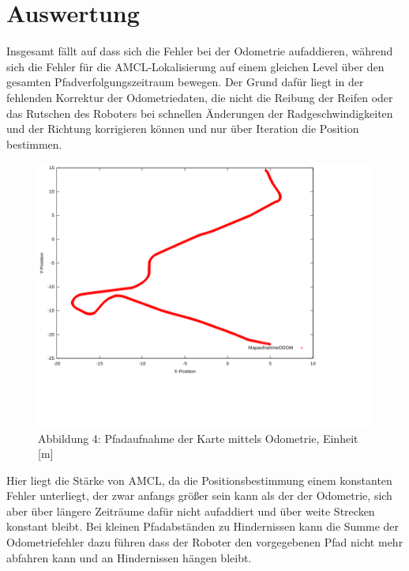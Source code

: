 \documentclass[11pt,a4paper]{article}
\begin{document}
\section{Auswertung}
Insgesamt fällt auf dass sich die Fehler bei der Odometrie aufaddieren, während sich die Fehler für die AMCL-Lokalisierung
auf einem gleichen Level über den gesamten Pfadverfolgungszeitraum bewegen. Der Grund dafür liegt in der fehlenden Korrektur der Odometriedaten, die 
nicht die Reibung der Reifen oder das Rutschen des Roboters bei schnellen Änderungen der Radgeschwindigkeiten und der Richtung korrigieren können und nur über Iteration die Position bestimmen.
\begin{figure}[H]
    \caption*{Abbildung 4: Pfadaufnahme der Karte mittels Odometrie, Einheit [m]}
    \includegraphics[scale = 0.6]{Plots/better ones/mapaufnahmeODOM.png}
    \centering
\end{figure}
\vspace{-25mm}
Hier liegt die Stärke von AMCL, da die Positionsbestimmung einem konstanten Fehler unterliegt, der zwar anfangs größer sein kann als der der Odometrie,
sich aber über längere Zeiträume dafür nicht aufaddiert und über weite Strecken konstant bleibt. Bei kleinen Pfadabständen zu Hindernissen kann die Summe der Odometriefehler dazu führen dass 
der Roboter den vorgegebenen Pfad nicht mehr abfahren kann und an Hindernissen hängen bleibt.
\end{document}
